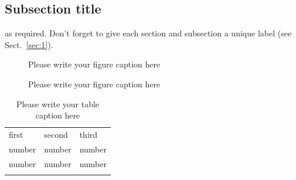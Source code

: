 \subsection{Subsection title}
\label{sec:2}
as required. Don't forget to give each section
and subsection a unique label (see Sect.~\ref{sec:1}).
%
\begin{figure}
\caption{Please write your figure caption here}
\label{fig:1}       %
\end{figure}
%
\begin{figure}
\vspace*{5cm}       %
\caption{Please write your figure caption here}
\label{fig:2}       %
\end{figure}
%
\begin{table}
\caption{Please write your table caption here}
\label{tab:1}       %
\begin{tabular}{lll}
\hline\noalign{\smallskip}
first & second & third  \\
\noalign{\smallskip}\hline\noalign{\smallskip}
number & number & number \\
number & number & number \\
\noalign{\smallskip}\hline
\end{tabular}
\vspace*{5cm}  %
\end{table}
